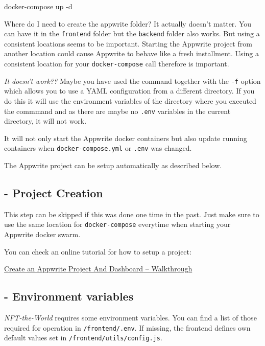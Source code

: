 \documentclass[
]{article}
\newenvironment{Shaded}{}{}
\newcommand{\ExtensionTok}[1]{#1}
\newcommand{\NormalTok}[1]{#1}
\begin{document}
\begin{Shaded}
\begin{Highlighting}[]
\ExtensionTok{docker-compose}\NormalTok{ up -d}
\end{Highlighting}
\end{Shaded}

Where do I need to create the appwrite folder? It actually doesn't
matter. You can have it in the \texttt{frontend} folder but the
\texttt{backend} folder also works. But using a consistent locations
seems to be important. Starting the Appwrite project from another
location could cause Appwrite to behave like a fresh installment. Using
a consistent location for your \texttt{docker-compose} call therefore is
important.

\emph{It doesn't work??} Maybe you have used the command together with
the \texttt{-f} option which allows you to use a YAML configuration from
a different directory. If you do this it will use the environment
variables of the directory where you executed the commmand and as there
are maybe no \texttt{.env} variables in the current directory, it will
not work.

It will not only start the Appwrite docker containers but also update
running containers when \texttt{docker-compose.yml} or \texttt{.env} was
changed.

The Appwrite project can be setup automatically as described below.

\hypertarget{project-creation}{%
\subsection{- Project Creation}\label{project-creation}}

This step can be skipped if this was done one time in the past. Just
make sure to use the same location for \texttt{docker-compose} everytime
when starting your Appwrite docker swarm.

You can check an online tutorial for how to setup a project:

\href{https://instacodeblog.com/create-an-appwrite-project-and-dashboard-walkthrough/}{Create
an Appwrite Project And Dashboard -- Walkthrough}

\hypertarget{environment-variables}{%
\subsection{- Environment variables}\label{environment-variables}}

\emph{NFT-the-World} requires some environment variables. You can find a
list of those required for operation in \texttt{/frontend/.env}. If
missing, the frontend defines own default values set in
\texttt{/frontend/utils/config.js}.
\end{document}
